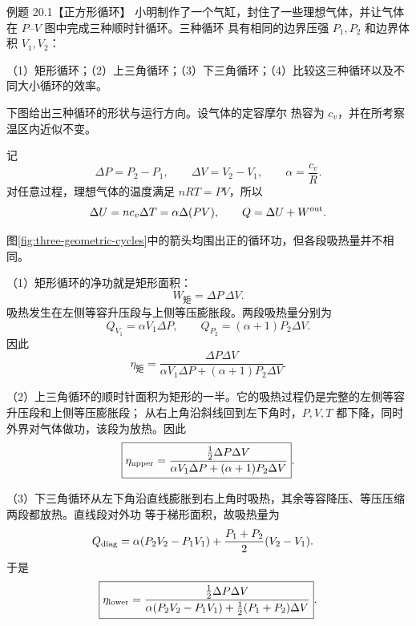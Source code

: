 \begin{origexamplebox}{例题 20.1【正方形循环】}
小明制作了一个气缸，封住了一些理想气体，并让气体在 $P$--$V$ 图中完成三种顺时针循环。三种循环
具有相同的边界压强 $P_1,P_2$ 和边界体积 $V_1,V_2$：

（1）矩形循环；（2）上三角循环；（3）下三角循环；（4）比较这三种循环以及不同大小循环的效率。

下图给出三种循环的形状与运行方向。设气体的定容摩尔
热容为 $c_v$，并在所考察温区内近似不变。
\threeCyclesDiagram
{}\label{fig:three-geometric-cycles}
\end{origexamplebox}

\begin{xesolution}
记
\begin{equation*}
  \Delta P=P_2-P_1,\qquad \Delta V=V_2-V_1,
  \qquad \alpha=\frac{c_v}{R}.
\end{equation*}
对任意过程，理想气体的温度满足 $nRT=PV$，所以
\begin{equation*}
  \Delta U=n c_v\Delta T=\alpha\Delta(PV),
  \qquad Q=\Delta U+W^{\rm out}.
\end{equation*}

图\ref{fig:three-geometric-cycles}中的箭头均围出正的循环功，但各段吸热量并不相同。

（1）矩形循环的净功就是矩形面积：
\begin{equation*}
  W_{\text{矩}}=\Delta P\,\Delta V.
\end{equation*}
吸热发生在左侧等容升压段与上侧等压膨胀段。两段吸热量分别为
\begin{equation*}
  Q_{V_1}=\alpha V_1\Delta P,
  \qquad
  Q_{P_2}=(\alpha+1)P_2\Delta V.
\end{equation*}
因此
\begin{equation}
  \boxed{\eta_{\text{矩}}=
  \frac{\Delta P\Delta V}
  {\alpha V_1\Delta P+(\alpha+1)P_2\Delta V}}.
\end{equation}

（2）上三角循环的顺时针面积为矩形的一半。它的吸热过程仍是完整的左侧等容升压段和上侧等压膨胀段；
从右上角沿斜线回到左下角时，$P,V,T$ 都下降，同时外界对气体做功，该段为放热。因此
\begin{equation}
  \boxed{\eta_{\rm upper}=
  \frac{\tfrac12\Delta P\Delta V}
  {\alpha V_1\Delta P+(\alpha+1)P_2\Delta V}}.
\end{equation}

（3）下三角循环从左下角沿直线膨胀到右上角时吸热，其余等容降压、等压压缩两段都放热。直线段对外功
等于梯形面积，故吸热量为
\begin{align*}
  Q_{\rm diag}
  &=\alpha(P_2V_2-P_1V_1)
    +\frac{P_1+P_2}{2}(V_2-V_1).
\end{align*}
于是
\begin{equation}
  \boxed{\eta_{\rm lower}=
  \frac{\tfrac12\Delta P\Delta V}
  {\alpha(P_2V_2-P_1V_1)+\tfrac12(P_1+P_2)\Delta V}}.
\end{equation}


\end{xesolution}
